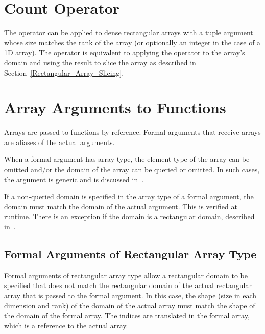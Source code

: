 \section{Count Operator}
\label{Count_Operator_Arrays}
The \chpl{#} operator can be applied to dense rectangular arrays with
a tuple argument whose size matches the rank of the array (or
optionally an integer in the case of a 1D array).  The operator is
equivalent to applying the \chpl{#} operator to the array's domain and
using the result to slice the array as described in
Section~\ref{Rectangular_Array_Slicing}.


\section{Array Arguments to Functions}
\label{Array_Arguments_To_Functions}

Arrays are passed to functions by reference.  Formal arguments that
receive arrays are aliases of the actual arguments.

%

When a formal argument has array type, the element type of the array
can be omitted and/or the domain of the array can be queried or
omitted.  In such cases, the argument is generic and is discussed
in~.

If a non-queried domain is specified in the array type of a formal
argument, the domain must match the domain of the actual argument.
This is verified at runtime.  There is an exception if the domain is
a rectangular domain, described
in~.


\subsection{Formal Arguments of Rectangular Array Type}
\label{Formal_Arguments_of_Rectangular_Array_Type}

Formal arguments of rectangular array type allow a rectangular domain
to be specified that does not match the rectangular domain of the
actual rectangular array that is passed to the formal argument.  In
this case, the shape (size in each dimension and rank) of the domain
of the actual array must match the shape of the domain of the formal
array.  The indices are translated in the formal array, which is a
reference to the actual array.

